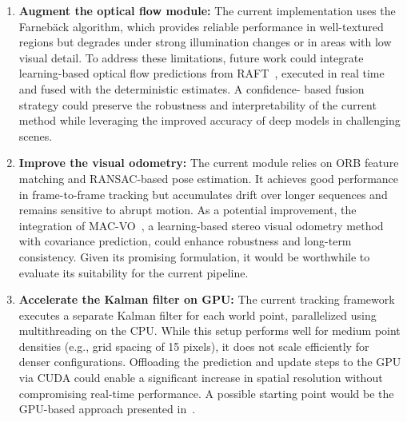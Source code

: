 \begin{enumerate}
  \item \textbf{Augment the optical flow module:} The current implementation 
      uses the Farnebäck algorithm, which provides reliable performance 
      in well-textured regions but degrades under strong illumination 
      changes or in areas with low visual detail. To address these 
      limitations, future work could integrate learning-based optical 
      flow predictions from RAFT~\cite{optical_flw_raft}, executed in 
      real time and fused with the deterministic estimates. A confidence-
      based fusion strategy could preserve the robustness and 
      interpretability of the current method while leveraging the 
      improved accuracy of deep models in challenging scenes.

  \item \textbf{Improve the visual odometry:} The current module relies on 
      \gls{ORB} feature matching and \gls{RANSAC}-based pose estimation. It achieves 
      good performance in frame-to-frame tracking but accumulates drift 
      over longer sequences and remains sensitive to abrupt motion. As a 
      potential improvement, the integration of MAC-\gls{VO}~\cite{macvo}, a 
      learning-based stereo visual odometry method with covariance 
      prediction, could enhance robustness and long-term consistency. 
      Given its promising formulation, it would be worthwhile to evaluate 
      its suitability for the current pipeline.

  \item \textbf{Accelerate the Kalman filter on GPU:} The current tracking 
      framework executes a separate Kalman filter for each world point, 
      parallelized using multithreading on the CPU. While this setup performs 
      well for medium point densities (e.g., grid spacing of 15 pixels), it 
      does not scale efficiently for denser configurations. Offloading the 
      prediction and update steps to the GPU via CUDA could enable a 
      significant increase in spatial resolution without compromising real-time 
      performance. A possible starting point would be the GPU-based approach 
      presented in~\cite{previous_tfm_gpu_implementation}.  


\end{enumerate}
